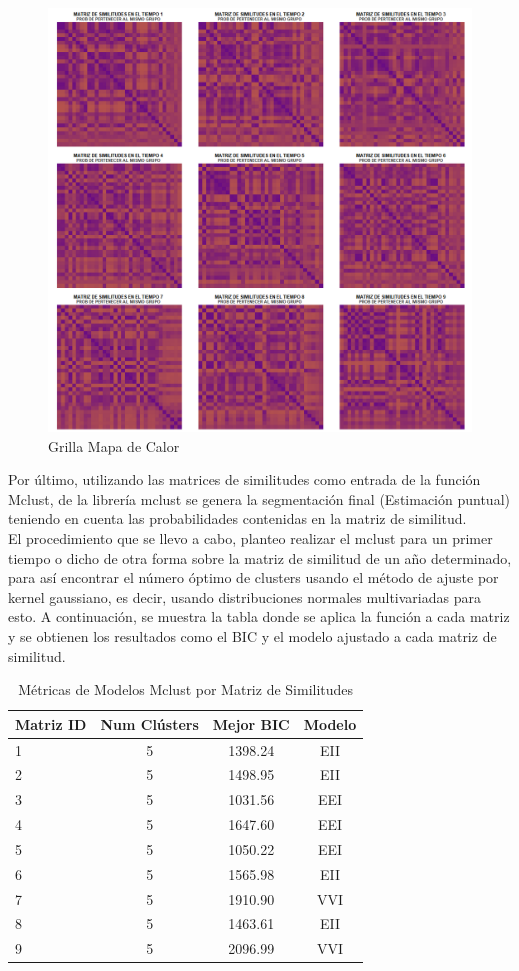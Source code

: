 \documentclass[12pt]{article}
\begin{document}
\begin{figure}[H]
    \centering
    \includegraphics[width=0.9\linewidth]{Imagenes/GrillaHeadMap.png}
    \caption{Grilla Mapa de Calor}
    \label{fig_enter_label}
\end{figure}

Por último, utilizando las matrices de similitudes como entrada de la función Mclust, de la librería mclust se genera la segmentación final (Estimación puntual) teniendo en cuenta las probabilidades contenidas en la matriz de similitud.\\

El procedimiento que se llevo a cabo, planteo realizar el mclust para un primer tiempo o dicho de otra forma sobre la matriz de similitud de un año determinado, para así encontrar el número óptimo de clusters usando el método de ajuste por kernel gaussiano, es decir, usando distribuciones normales multivariadas para esto. A continuación, se muestra la tabla donde se aplica la función a cada matriz y se obtienen los resultados como el BIC y el modelo ajustado a cada matriz de similitud.

\begin{table}[H]
\centering
\begin{tabular}{lccc}
\hline
\textbf{Matriz ID} & \textbf{Num Clústers} & \textbf{Mejor BIC} & \textbf{Modelo} \\
\hline
1 & 5 & 1398.24 & EII \\
2 & 5 & 1498.95 & EII \\
3 & 5 & 1031.56 & EEI \\
4 & 5 & 1647.60 & EEI \\
5 & 5 & 1050.22 & EEI \\
6 & 5 & 1565.98 & EII \\
7 & 5 & 1910.90 & VVI \\
8 & 5 & 1463.61 & EII \\
9 & 5 & 2096.99 & VVI \\
\hline
\end{tabular}
\caption{Métricas de Modelos Mclust por Matriz de Similitudes}
\label{tab:metricas-mclust}
\end{table}
\end{document}
